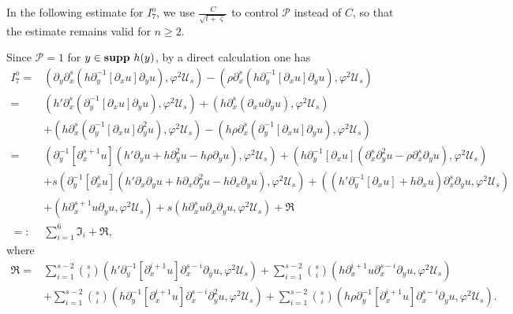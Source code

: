 \documentclass{amsart}
\numberwithin{equation}{section}
\begin{document}
In the following estimate for $I_{7}^{o}$, we use $\frac{C}{\sqrt{t+\bar{\varsigma}}}$ to control $\mathcal{P}$ instead of $C$, so that the estimate remains valid for $n\geq 2$.

Since $\mathcal{P}=1$ for $y\in{\bf supp}~h(y)$, by a direct calculation one has
\begin{align*}
I_{7}^{o}
=& (\partial_{y}\partial_{x}^{s}(h\partial_{y}^{-1}[\partial_{x}u]\partial_{y}u),\varphi^{2}\mathcal{U}_{s})
  -(\rho\partial_{x}^{s}(h\partial_{y}^{-1}[\partial_{x}u]\partial_{y}u),\varphi^{2}\mathcal{U}_{s})\\
=& (h'\partial_{x}^{s}(\partial_{y}^{-1}[\partial_{x}u]\partial_{y}u),\varphi^{2}\mathcal{U}_{s})
  +(h\partial_{x}^{s}(\partial_{x}u\partial_{y}u),\varphi^{2}\mathcal{U}_{s})\\
 &+(h\partial_{x}^{s}(\partial_{y}^{-1}[\partial_{x}u]\partial_{y}^{2}u),\varphi^{2}\mathcal{U}_{s})
  -(h\rho\partial_{x}^{s}(\partial_{y}^{-1}[\partial_{x}u]\partial_{y}u),\varphi^{2}\mathcal{U}_{s})\\
=& (\partial_{y}^{-1}[\partial_{x}^{s+1}u](h'\partial_{y}u+h\partial_{y}^{2}u-h\rho\partial_{y}u),\varphi^{2}\mathcal{U}_{s})
  +(h\partial_{y}^{-1}[\partial_{x}u](\partial_{x}^{s}\partial_{y}^{2}u-\rho\partial_{x}^{s}\partial_{y}u),\varphi^{2}\mathcal{U}_{s})\\
 &+s(\partial_{y}^{-1}[\partial_{x}^{s}u](h'\partial_{x}\partial_{y}u+h\partial_{x}\partial_{y}^{2}u-h\partial_{x}\partial_{y}u),\varphi^{2}\mathcal{U}_{s})
  +((h'\partial_{y}^{-1}[\partial_{x}u]+h\partial_{x}u)\partial_{x}^{s}\partial_{y}u,\varphi^{2}\mathcal{U}_{s})\\
 &+(h\partial_{x}^{s+1}u\partial_{y}u,\varphi^{2}\mathcal{U}_{s})
  +s(h\partial_{x}^{s}u\partial_{x}\partial_{y}u,\varphi^{2}\mathcal{U}_{s})
  +\mathfrak{R}\\
=:& \sum_{i=1}^{6}\mathfrak{I}_{i}+\mathfrak{R},
\end{align*}
where
\begin{align*}
\mathfrak{R}
=& \sum_{i=1}^{s-2}\binom{s}{i}(h'\partial_{y}^{-1}[\partial_{x}^{i+1}u]\partial_{x}^{s-i}\partial_{y}u,\varphi^{2}\mathcal{U}_{s})
  +\sum_{i=1}^{s-2}\binom{s}{i}(h\partial_{x}^{i+1}u\partial_{x}^{s-i}\partial_{y}u,\varphi^{2}\mathcal{U}_{s})\\
 &+\sum_{i=1}^{s-2}\binom{s}{i}(h\partial_{y}^{-1}[\partial_{x}^{i+1}u]\partial_{x}^{s-i}\partial_{y}^{2}u,\varphi^{2}\mathcal{U}_{s})
  +\sum_{i=1}^{s-2}\binom{s}{i}(h\rho\partial_{y}^{-1}[\partial_{x}^{i+1}u]\partial_{x}^{s-i}\partial_{y}u,\varphi^{2}\mathcal{U}_{s}).
\end{align*}
\end{document}
